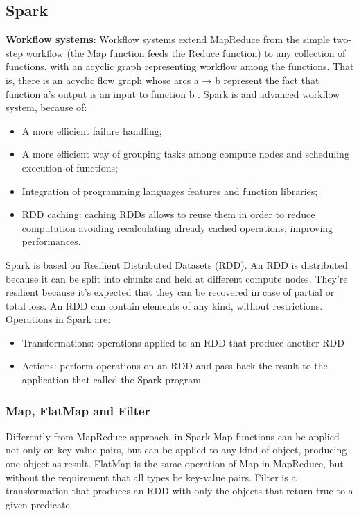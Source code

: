 \documentclass[\main/main.tex]{subfiles}
\begin{document}
\subsection{Spark}
\textbf{Workflow systems}: Workflow systems extend MapReduce from the simple two-step workflow (the Map function feeds the Reduce function) to any collection of functions, with an acyclic graph representing workflow among the functions. That is, there is an acyclic flow graph whose arcs a → b represent the fact that function a’s output is an input to function b \cite{leskovec_rajaraman_ullman_2020}.
Spark is and advanced workflow system, because of:
\begin{itemize}
    \item A more efficient failure handling;
    \item A more efficient way of grouping tasks among compute nodes and scheduling execution of functions;
    \item Integration of programming languages features and function libraries;
    \item RDD caching: caching RDDs allows to reuse them in order to reduce computation avoiding recalculating already cached operations, improving performances. 
\end{itemize}
Spark is based on Resilient Distributed Datasets (RDD). An RDD is distributed because it can be split into chunks and held at different compute nodes. They're resilient because it's expected that they can be recovered in case of partial or total loss. An RDD can contain elements of any kind, without restrictions.
Operations in Spark are:
\begin{itemize}
    \item Transformations: operations applied to an RDD that produce another RDD
    \item Actions: perform operations on an RDD and pass back the result to the application that called the Spark program
\end{itemize}
\subsubsection{Map, FlatMap and Filter}
Differently from MapReduce approach, in Spark Map functions can be applied not only on key-value pairs, but can be applied to any kind of object, producing one object as result. 
FlatMap is the same operation of Map in MapReduce, but without the requirement that all types be key-value pairs. Filter is a transformation that produces an RDD with only the objects that return true to a given predicate.
\end{document}
